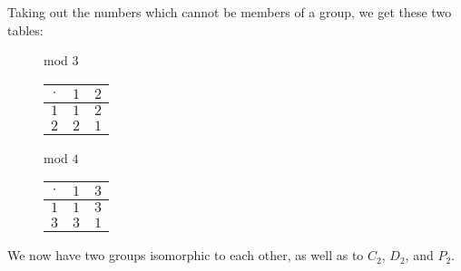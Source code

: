 \documentclass[../gatm.tex]{subfiles}
\begin{document}
\noindent Taking out the numbers which cannot be members of a group, we get these two tables:

\begin{figure}[h]
	\begin{center}
		\begin{minipage}[t]{0.45\textwidth}
			\centering
			mod $3$ \\
			\vspace*{\baselineskip}
			\begin{tabular}{c|cc}
				\hline
				$\cdot$ & $1$ & $2$ \\ \hline
				\rowcolor{light-gray}
				$1$ & $1$ & $2$ \\
				$2$ & $2$ & $1$ \\ \hline
			\end{tabular}
		\end{minipage}
		\hfill
		\begin{minipage}[t]{0.45\textwidth}
			\centering
			mod $4$ \\
			\vspace*{\baselineskip}
			\begin{tabular}{c|cc}
				\hline
				$\cdot$ & $1$ & $3$ \\ \hline
				\rowcolor{light-gray}
				$1$ & $1$ & $3$ \\
				$3$ & $3$ & $1$ \\ \hline
			\end{tabular}
		\end{minipage}
	\end{center}
\end{figure}

\noindent We now have two groups isomorphic to each other, as well as to $C_2$, $D_2$, and $P_2$.
\end{document}
